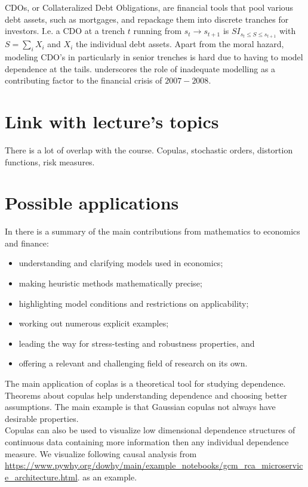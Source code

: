\documentclass[a4paper,12pt]{article}
\begin{document}
CDOs, or Collateralized Debt Obligations, are financial tools that pool various debt assets,
such as mortgages, and repackage them into discrete tranches for investors.
I.e. a CDO at a trench $t$ running from $s_{t} \rightarrow s_{t+1}$ is
$S I_{s_{t} \le S \le s_{t+1}}$ with $S = \sum_{i} X_{i}$ and $X_{i}$ the
individual debt assets. Apart from the moral hazard,  modeling CDO's in particularly
in senior trenches is hard due to having to model dependence at the tails.
\cite{donnelly_devil_nodate} underscores the role of inadequate modelling as
a contributing factor to the financial crisis of $2007-2008$.

\section{Link with lecture's topics}

There is a lot of overlap with the course. Copulas, stochastic orders, distortion functions, risk measures.

\section{Possible applications}
In \cite{donnelly_devil_nodate} there is a summary of the main contributions
from mathematics to economics and finance:
\begin{itemize}
    \item  understanding and clarifying models used in economics;
    \item  making heuristic methods mathematically precise;
    \item  highlighting model conditions and restrictions on applicability;
    \item  working out numerous explicit examples;
    \item  leading the way for stress-testing and robustness properties, and
    \item  offering a relevant and challenging field of research on its own.
\end{itemize}

The main application of coplas is a theoretical tool for studying dependence.
Theorems about copulas help understanding dependence and choosing better assumptions.
The main example is that Gaussian copulas not always have desirable properties. \\

Copulas can also be used to visualize low dimensional dependence structures of continuous data containing more
information then any individual dependence measure. We visualize following causal analysis from \url{https://www.pywhy.org/dowhy/main/example_notebooks/gcm_rca_microservice_architecture.html}.
as an example.
\end{document}
